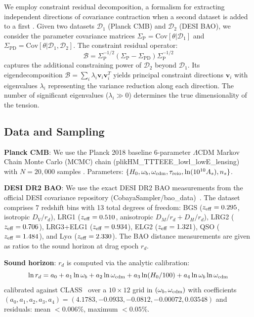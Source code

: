\documentclass[12pt,preprint]{aastex631}
\newcommand{\szero}[0]{\Sigma_{\mathrm{P}}}
\newcommand{\sone}[0]{\Sigma_{\mathrm{PD}}}
\begin{document}
We employ constraint residual decomposition, a formalism for extracting independent directions of covariance contraction when a second dataset is added to a first \citep{sam2026}. Given two datasets $\mathcal{D}_1$ (Planck CMB) and $\mathcal{D}_2$ (DESI BAO), we consider the parameter covariance matrices $\szero = \mathrm{Cov}[\theta | \mathcal{D}_1]$ and $\sone = \mathrm{Cov}[\theta | \mathcal{D}_1, \mathcal{D}_2]$. The constraint residual operator:
\begin{equation}
\mathcal{B} = \szero^{-1/2} \left(\szero - \sone\right) \szero^{-1/2}
\label{eq:bop}
\end{equation}
captures the additional constraining power of $\mathcal{D}_2$ beyond $\mathcal{D}_1$. Its eigendecomposition $\mathcal{B} = \sum_i \lambda_i \mathbf{v}_i \mathbf{v}_i^T$ yields principal constraint directions $\mathbf{v}_i$ with eigenvalues $\lambda_i$ representing the variance reduction along each direction. The number of significant eigenvalues ($\lambda_i \gg 0$) determines the true dimensionality of the tension.

\subsection{Data and Sampling}

\textbf{Planck CMB}: We use the Planck 2018 baseline 6-parameter $\Lambda$CDM Markov Chain Monte Carlo (MCMC) chain (plikHM\_TTTEEE\_lowl\_lowE\_lensing) with $N = 20,000$ samples \citep{planck2020}. Parameters: $\{H_0, \omega_b, \omega_{\rm cdm}, \tau_{\rm reio}, \ln(10^{10} A_s), n_s\}$.

\textbf{DESI DR2 BAO}: We use the exact DESI DR2 BAO measurements from the official DESI covariance repository (CobayaSampler/bao\_data)~\citep{desi2025dr2}. The dataset comprises 7 redshift bins with 13 total degrees of freedom: BGS ($z_{\rm eff}=0.295$, isotropic $D_V/r_d$), LRG1 ($z_{\rm eff}=0.510$, anisotropic $D_M/r_d + D_H/r_d$), LRG2 ($z_{\rm eff}=0.706$), LRG3+ELG1 ($z_{\rm eff}=0.934$), ELG2 ($z_{\rm eff}=1.321$), QSO ($z_{\rm eff}=1.484$), and Ly$\alpha$ ($z_{\rm eff}=2.330$). The BAO distance measurements are given as ratios to the sound horizon at drag epoch $r_d$.

\textbf{Sound horizon}: $r_d$ is computed via the analytic calibration:
\begin{equation}
\ln r_d = a_0 + a_1 \ln \omega_b + a_2 \ln \omega_{\rm cdm} + a_3 \ln(H_0/100) + a_4 \ln \omega_b \ln \omega_{\rm cdm}
\label{eq:rdcal}
\end{equation}
calibrated against CLASS~\citep{blas2011, lesgourgues2011} over a $10 \times 12$ grid in $(\omega_b, \omega_{\rm cdm})$ with coefficients $(a_0, a_1, a_2, a_3, a_4) = (4.1783, -0.0933, -0.0812, -0.00072, 0.03548)$ and residuals: mean $<0.006\%$, maximum $<0.05\%$.
\end{document}
